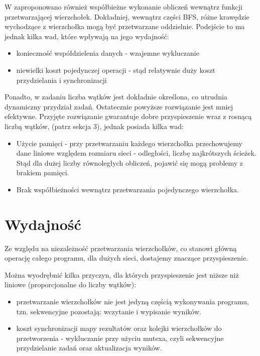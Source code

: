 \documentclass[]{article}
\begin{document}
W \parencite[p. 539-550]{bader:06} zaproponowano również współbieżne wykonanie obliczeń wewnątrz funkcji przetwarzającej wierzchołek. Dokładniej, wewnątrz części BFS, różne krawędzie wychodzące z wierzchołka mogą być przetwarzane oddzielnie. Podejście to ma jednak kilka wad, które wpływają na jego wydajność:
\begin{itemize}
\item konieczność współdzielenia danych - wzajemne wykluczanie 
\item niewielki koszt pojedynczej operacji - stąd relatywnie duży koszt przydzielania i synchronizacji
\end{itemize}
Ponadto, w zadaniu liczba wątków jest dokładnie określona, co utrudnia dynamiczny przydział zadań. Ostatecznie powyższe rozwiązanie jest mniej efektywne. \newline
Przyjęte rozwiązanie gwarantuje dobre przyspieszenie wraz z rosnącą liczbą wątków, (patrz sekcja 3), jednak posiada kilka wad:
\begin{itemize}
\item Użycie pamięci - przy przetwarzaniu każdego wierzchołka przechowujemy dane liniowe względem rozmiaru sieci - odległości, liczbę najkrótszych ścieżek. Stąd dla dużej liczby równoległych obliczeń, pojawić się mogą problemy z brakiem pamięci.

\item Brak współbieżności wewnątrz przetwarzania pojedynczego wierzchołka.

\end{itemize}


\section{Wydajność}

Ze względu na niezależność przetwarzania wierzchołków, co stanowi główną operację całego programu, dla dużych sieci, dostajemy znaczące przyspieszenie.

Można wyodrębnić kilka przyczyn, dla których przyspieszenie jest niższe niż liniowe (proporcjonalne do liczby wątków):
\begin{itemize}
\item przetwarzanie wierzchołków nie jest jedyną częścią wykonywania programu, tzn. sekwencyjne pozostają: wczytanie i wypisanie wyników.

\item koszt synchronizacji mapy rezultatów oraz kolejki wierzchołków do przetworzenia - wykluczanie przy użyciu mutexa, czyli sekwencyjne przydzielanie zadań oraz aktualizacja wyników.

\end{itemize}
\end{document}
